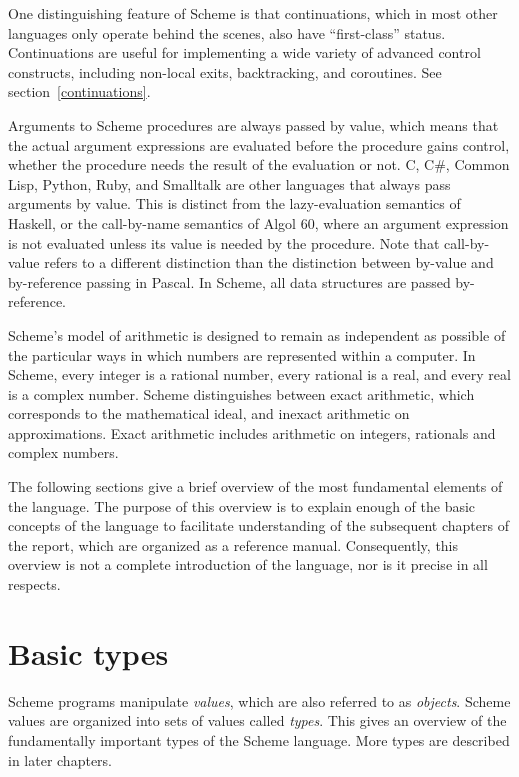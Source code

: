 \vest One distinguishing feature of Scheme is that continuations, which
in most other languages only operate behind the scenes, also have
``first-class'' status.  Continuations are useful for implementing a
wide variety of advanced control constructs, including non-local exits,
backtracking, and coroutines.  See section~\ref{continuations}.

\vest Arguments to Scheme procedures are always passed by value, which
means that the actual argument expressions are evaluated before the
procedure gains control, whether the procedure needs the result of the
evaluation or not.  C, C\#, Common Lisp, Python, Ruby, and Smalltalk
are other languages that always pass arguments by value.  This is
distinct from the lazy-evaluation semantics of Haskell, or the
call-by-name semantics of Algol 60, where an argument expression is
not evaluated unless its value is needed by the procedure.  Note that
call-by-value refers to a different distinction than the distinction
between by-value and by-reference passing in Pascal.  In Scheme, all
data structures are passed by-reference.

\vest Scheme's model of arithmetic is designed to remain as
independent as possible of the particular ways in which numbers are
represented within a computer. In Scheme, every integer is a rational
number, every rational is a real, and every real is a complex number.
Scheme distinguishes between exact arithmetic, which corresponds to
the mathematical ideal, and inexact arithmetic on approximations.
Exact arithmetic includes arithmetic on integers, rationals and
complex numbers.

The following sections give a brief overview of the most fundamental
elements of the language.  The purpose of this overview is to explain
enough of the basic concepts of the language to facilitate
understanding of the subsequent chapters of the report, which are
organized as a reference manual.  Consequently, this overview is
not a complete introduction of the language, nor is it precise
in all respects.

\section{Basic types}

Scheme programs manipulate \textit{values}, which are also referred
to as \textit{objects}.
Scheme values are organized into sets of values called \textit{types}.
This gives an overview of the fundamentally important types of the
Scheme language.  More types are described in later chapters.

